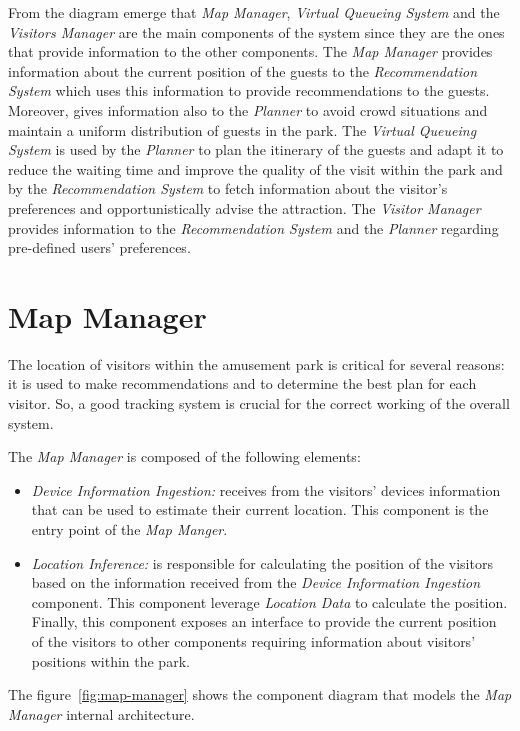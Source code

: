 From the diagram emerge that \textit{Map Manager}, \textit{Virtual Queueing System} and the \textit{Visitors Manager} are the main components of the system since they are the ones
that provide information to the other components. The \textit{Map Manager} provides information about the current position of the guests to the
\textit{Recommendation System} which uses this information to provide recommendations to the guests. Moreover, gives information also to the
\textit{Planner} to avoid crowd situations and maintain a uniform distribution of guests in the park. The \textit{Virtual Queueing System} is used by
the \textit{Planner} to plan the itinerary of the guests and adapt it to reduce the waiting time and improve the quality of the visit within the park
and by the \textit{Recommendation System} to fetch information about the visitor's preferences and opportunistically advise the
attraction. The \textit{Visitor Manager} provides information to the \textit{Recommendation System} and the \textit{Planner} regarding pre-defined users' preferences.

\section{Map Manager}

The location of visitors within the amusement park is critical for several reasons: it is used to make recommendations and to
determine the best plan for each visitor. So, a good tracking system is crucial for the correct working of the overall system.

The \textit{Map Manager} is composed of the following elements:
\begin{itemize}
	\item \textit{Device Information Ingestion:} receives from the visitors' devices information that can be used to estimate their current location. This component is the entry point of the \textit{Map Manger}.
	\item \textit{Location Inference:} is responsible for calculating the position of the visitors based on the information received from the
	      \textit{Device Information Ingestion} component. This component leverage \textit{Location Data} to calculate the position.
	      Finally, this component exposes an interface to provide the current position of the visitors to other components requiring information about visitors' positions within the park.
\end{itemize}

The figure~\ref{fig:map-manager} shows the component diagram that models the \textit{Map Manager} internal architecture.

